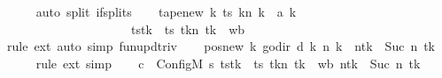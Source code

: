 \begin{isabellebody}
\ \ \ \ \isamarkupfalse%
\ {\isacharparenleft}{\kern0pt}auto\ split{\isacharcolon}{\kern0pt}\ if{\isacharunderscore}{\kern0pt}splits{\isacharparenright}{\kern0pt}\isanewline
\ \ \isamarkupfalse%
\ tape{\isacharunderscore}{\kern0pt}new{\isacharcolon}{\kern0pt}\ {\isachardoublequoteopen}{\isacharparenleft}{\kern0pt}{\isasymlambda}k{\isachardot}{\kern0pt}\ {\isacharparenleft}{\kern0pt}ts\ k{\isacharparenright}{\kern0pt}{\isacharparenleft}{\kern0pt}n\ k\ {\isacharcolon}{\kern0pt}{\isacharequal}{\kern0pt}\ {\isacharquery}{\kern0pt}a{\isacharprime}{\kern0pt}\ k{\isacharparenright}{\kern0pt}{\isacharparenright}{\kern0pt}\isanewline
\ \ \ \ \ \ \ \ \ \ \ \ \ \ \ \ \ \ \ \ {\isacharequal}{\kern0pt}\ ts{\isacharparenleft}{\kern0pt}tk\ {\isacharcolon}{\kern0pt}{\isacharequal}{\kern0pt}\ {\isacharparenleft}{\kern0pt}ts\ tk{\isacharparenright}{\kern0pt}{\isacharparenleft}{\kern0pt}n\ tk\ {\isacharcolon}{\kern0pt}{\isacharequal}{\kern0pt}\ {\isacharquery}{\kern0pt}wb{\isacharparenright}{\kern0pt}{\isacharparenright}{\kern0pt}{\isachardoublequoteclose}\isanewline
\ \ \ \ \isamarkupfalse%
\ {\isacharparenleft}{\kern0pt}rule\ ext{\isacharparenright}{\kern0pt}\ {\isacharparenleft}{\kern0pt}auto\ simp{\isacharcolon}{\kern0pt}\ fun{\isacharunderscore}{\kern0pt}upd{\isacharunderscore}{\kern0pt}triv{\isacharparenright}{\kern0pt}\isanewline
\ \ \isamarkupfalse%
\ pos{\isacharunderscore}{\kern0pt}new{\isacharcolon}{\kern0pt}\ {\isachardoublequoteopen}{\isacharparenleft}{\kern0pt}{\isasymlambda}k{\isachardot}{\kern0pt}\ go{\isacharunderscore}{\kern0pt}dir\ {\isacharparenleft}{\kern0pt}{\isacharquery}{\kern0pt}d\ k{\isacharparenright}{\kern0pt}\ {\isacharparenleft}{\kern0pt}n\ k{\isacharparenright}{\kern0pt}{\isacharparenright}{\kern0pt}\ {\isacharequal}{\kern0pt}\ n{\isacharparenleft}{\kern0pt}tk\ {\isacharcolon}{\kern0pt}{\isacharequal}{\kern0pt}\ Suc\ {\isacharparenleft}{\kern0pt}n\ tk{\isacharparenright}{\kern0pt}{\isacharparenright}{\kern0pt}{\isachardoublequoteclose}\isanewline
\ \ \ \ \isamarkupfalse%
\ {\isacharparenleft}{\kern0pt}rule\ ext{\isacharparenright}{\kern0pt}\ simp\isanewline
\ \ \isamarkupfalse%
\ {\isacharquery}{\kern0pt}c{\isacharprime}{\kern0pt}{\isacharprime}{\kern0pt}\ {\isacharequal}{\kern0pt}\ {\isachardoublequoteopen}Config\isactrlsub M\ {\isacharquery}{\kern0pt}s{\isacharprime}{\kern0pt}\ {\isacharparenleft}{\kern0pt}ts{\isacharparenleft}{\kern0pt}tk\ {\isacharcolon}{\kern0pt}{\isacharequal}{\kern0pt}\ {\isacharparenleft}{\kern0pt}ts\ tk{\isacharparenright}{\kern0pt}{\isacharparenleft}{\kern0pt}n\ tk\ {\isacharcolon}{\kern0pt}{\isacharequal}{\kern0pt}\ {\isacharquery}{\kern0pt}wb{\isacharparenright}{\kern0pt}{\isacharparenright}{\kern0pt}{\isacharparenright}{\kern0pt}\ {\isacharparenleft}{\kern0pt}n{\isacharparenleft}{\kern0pt}tk\ {\isacharcolon}{\kern0pt}{\isacharequal}{\kern0pt}\ Suc\ {\isacharparenleft}{\kern0pt}n\ tk{\isacharparenright}{\kern0pt}{\isacharparenright}{\kern0pt}{\isacharparenright}{\kern0pt}{\isachardoublequoteclose}\isanewline

\end{isabellebody}
